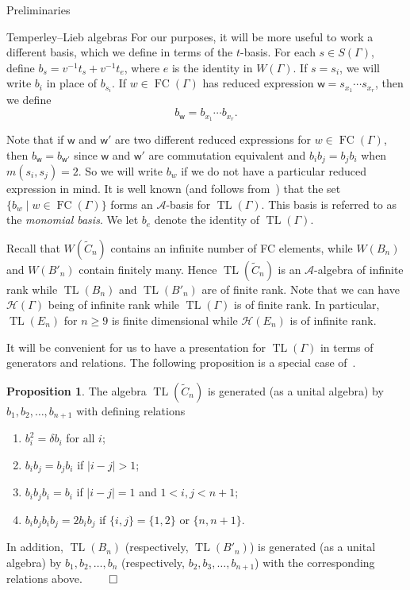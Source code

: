 \documentclass[11pt]{amsart}
\theoremstyle{definition}
\newtheorem{proposition}[theorem]{Proposition}
\numberwithin{equation}{section}
\newcommand{\A}{\mathcal{A}}
\newcommand{\C}{\widetilde{C}}
\DeclareMathOperator{\TL}{TL}
\renewcommand{\(}{\left(}
\renewcommand{\)}{\right)}
\newcommand{\w}{\mathsf{w}}
\renewcommand{\H}{\mathcal{H}}
\DeclareMathOperator{\FC}{FC}
\begin{document}
\begin{section}{Preliminaries}
\begin{subsection}{Temperley--Lieb algebras}
For our purposes, it will be more useful to work a different basis, which we define in terms of the $t$-basis. For each $s \in S(\Gamma)$, define $b_{s}=v^{-1}t_{s}+v^{-1}t_{e}$, where $e$ is the identity in $W(\Gamma)$.  If $s=s_{i}$, we will write $b_{i}$ in place of $b_{s_{i}}$.  If $w \in \FC(\Gamma)$ has reduced expression $\w=s_{x_{1}}\cdots s_{x_{r}}$, then we define 
\[
b_{\w}=b_{x_{1}}\cdots b_{x_{r}}.
\]

Note that if $\w$ and $\w'$ are two different reduced expressions for $w \in \FC(\Gamma)$, then $b_{\w}=b_{\w'}$ since $\w$ and $\w'$ are commutation equivalent and $b_{i}b_{j}=b_{j}b_{i}$ when $m(s_{i}, s_{j})=2$.  So we will write $b_{w}$ if we do not have a particular reduced expression in mind.  It is well known (and follows from~\cite[Proposition 2.4]{Green2006a}) that the set $\{b_{w}\mid w \in \FC(\Gamma)\}$ forms an $\A$-basis for $\TL(\Gamma)$.  This basis is referred to as the \emph{monomial basis}.  We let $b_{e}$ denote the identity of $\TL(\Gamma)$.

Recall that $W(\C_{n})$ contains an infinite number of FC elements, while $W(B_{n})$ and $W(B'_{n})$ contain finitely many.  Hence $\TL(\C_{n})$ is an $\A$-algebra of infinite rank while $\TL(B_{n})$ and $\TL(B'_{n})$ are of finite rank.  Note that we can have $\H(\Gamma)$ being of infinite rank while $\TL(\Gamma)$ is of finite rank.  In particular, $\TL(E_n)$ for $n\geq 9$ is finite dimensional while $\H(E_n)$ is of infinite rank.

It will be convenient for us to have a presentation for $\TL(\Gamma)$ in terms of generators and relations. The following proposition is a special case of~\cite[Proposition 2.6]{Green2006a}.  

\begin{proposition}\label{prop:affine C relations}
The algebra $\TL(\C_{n})$ is generated (as a unital algebra) by $b_{1}, b_{2}, \dots, b_{n+1}$ with defining relations
\begin{enumerate}[label=\rm{(\arabic*)}]
\item $b_{i}^{2}=\delta b_{i}$ for all $i$;
\item $b_{i}b_{j}=b_{j}b_{i}$ if $|i-j|>1$;
\item $b_{i}b_{j}b_{i}=b_{i}$ if $|i-j|=1$ and $1< i,j < n+1$;
\item $b_{i}b_{j}b_{i}b_{j}=2b_{i}b_{j}$ if $\{i,j\}=\{1,2\}$ or $\{n,n+1\}$.
\end{enumerate}
In addition, $\TL(B_{n})$ (respectively, $\TL(B'_{n})$) is generated (as a unital algebra) by $b_{1}, b_{2}, \dots, b_{n}$ (respectively, $b_{2}, b_{3}, \dots, b_{n+1}$) with the corresponding relations above.  \hfill $\qed$
\end{proposition}


\end{subsection}
\end{section}
\end{document}
